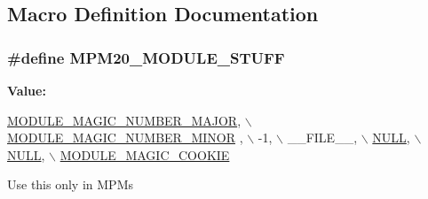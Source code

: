 \subsection{Macro Definition Documentation}
\subsubsection[{\texorpdfstring{M\+P\+M20\+\_\+\+M\+O\+D\+U\+L\+E\+\_\+\+S\+T\+U\+FF}{MPM20_MODULE_STUFF}}]{\setlength{\rightskip}{0pt plus 5cm}\#define M\+P\+M20\+\_\+\+M\+O\+D\+U\+L\+E\+\_\+\+S\+T\+U\+FF}\hypertarget{group__ModuleInit_ga4b6f78d2b0b5f8786dd2504558034332}{}\label{group__ModuleInit_ga4b6f78d2b0b5f8786dd2504558034332}
{\bfseries Value\+:}
\begin{DoxyCode}
\hyperlink{group__APACHE__CORE__MMN_ga317b5a0001d505331fafd3864636c2ad}{MODULE\_MAGIC\_NUMBER\_MAJOR}, \hyperlink{group__APACHE__CORE__MMN_ga588f30a3c70ecc64ad0db18393cc34f2}{\(\backslash\)}
\hyperlink{group__APACHE__CORE__MMN_ga588f30a3c70ecc64ad0db18393cc34f2}{                                MODULE\_MAGIC\_NUMBER\_MINOR}
      , \(\backslash\)
                                -1, \(\backslash\)
                                \_\_FILE\_\_, \hyperlink{pcre_8txt_ad7f989d16aa8ca809a36bc392c07fba1}{\(\backslash\)}
\hyperlink{pcre_8txt_ad7f989d16aa8ca809a36bc392c07fba1}{                                NULL}, \hyperlink{pcre_8txt_ad7f989d16aa8ca809a36bc392c07fba1}{\(\backslash\)}
\hyperlink{pcre_8txt_ad7f989d16aa8ca809a36bc392c07fba1}{                                NULL}, \hyperlink{group__APACHE__CORE__MMN_ga2c4ca3863cb05770bbe7d6a795bcaa3e}{\(\backslash\)}
\hyperlink{group__APACHE__CORE__MMN_ga2c4ca3863cb05770bbe7d6a795bcaa3e}{                                MODULE\_MAGIC\_COOKIE}
\end{DoxyCode}
Use this only in M\+P\+Ms 
